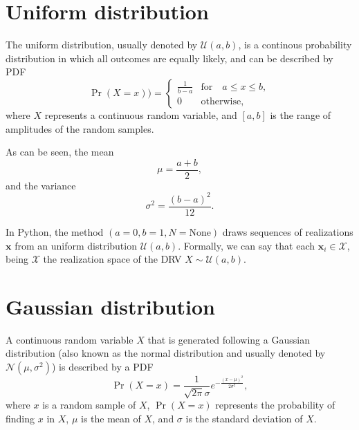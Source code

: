 
\section{Uniform distribution}

The uniform distribution, usually denoted by $\mathcal{U}(a,b)$, is a
continous probability distribution in which all outcomes are equally
likely, and can be described by \gls{PDF}
\begin{equation}
  \Pr(X{=}x)) =
  \begin{cases}
    \frac{1}{b-a} & \text{for}\quad a \le x \le b, \\
    0 & \text{otherwise},
  \end{cases}
\end{equation}
where $X$ represents a continuous random variable, and $[a, b]$ is the
range of amplitudes of the random samples.

As can be seen, the mean
\begin{equation}
  \mu = \frac{a+b}{2},
\end{equation}
and the variance
\begin{equation}
  \sigma^2 = \frac{(b-a)^{2}}{12}.
\end{equation}

In Python, the method
\href{https://numpy.org/doc/stable/reference/random/generated/numpy.random.uniform.html}{$(a=0,
  b=1, N=\text{None})$} draws sequences of realizations $\bm{x}$ from
an uniform distribution $\mathcal{U}(a,b)$. Formally, we can say that
each $\bm{x}_i\in\mathcal{X}$, being $\mathcal{X}$ the realization
space of the \gls{DRV} $X\sim\mathcal{U}(a,b)$.


\section{Gaussian distribution}
\label{sec:gaussian_distribution}

A continuous random variable $X$ that is generated following a Gaussian
distribution (also known as the normal distribution and usually denoted
by $\mathcal{N}(\mu, \sigma^2)$) is described by a \gls{PDF}
\begin{equation}
  \Pr(X{=}x) = \frac{1}{\sqrt{2\pi}\sigma} e^{-\frac{(x-\mu)^2}{2\sigma^2} },
  \label{eq:normal_PDF}
\end{equation}
where $x$ is a random sample of $X$, $\Pr(X{=}x)$ represents the
probability of finding $x$ in $X$, $\mu$ is the mean of $X$, and
$\sigma$ is the standard deviation of $X$.

